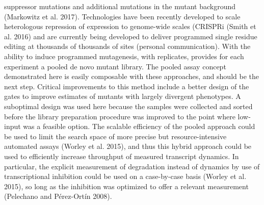 suppressor mutations and additional mutations in the mutant background
(Markowitz et al. 2017). Technologies have been recently developed to
scale heterologous repression of expression to genome-wide scales
(CRISPRi (Smith et al. 2016) and are currently being developed to
deliver programmed single residue editing at thousands of thousands of
sites (personal communication). With the ability to induce programmed
mutagenesis, with  replicates, provides for each experiment a pooled
de novo mutant library. The pooled assay concept demonstrated here is
easily composable with these approaches, and should be the next step.
Critical improvements to this method include a better design of the
gates to improve estimates of mutants with largely divergent
phenotypes. A suboptimal design was used here because the samples were
collected and sorted before the library preparation procedure was
improved to the point where low-input was a feasible option.  The
scalable efficiency of the pooled approach could be used to limit the
search space of more precise but resource-intensive automated assays
(Worley et al. 2015), and thus this hybrid approach could be used to
efficiently increase throughput of measured transcript dynamics. In
particular, the explicit measurement of degradation instead of
dynamics by use of transcriptional inhibition could be used on a
case-by-case basis (Worley et al. 2015), so long as the inhibition was
optimized to offer a relevant measurement (Pelechano and Pérez-Ortín
2008).

